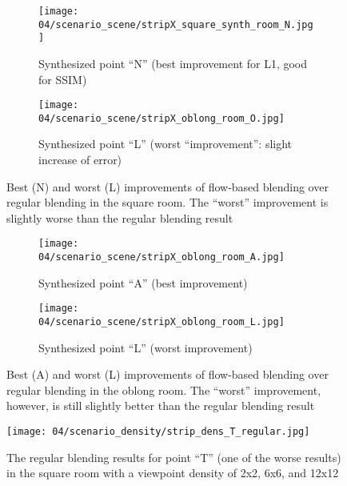 \begin{figure}
\centering
    \hfill
    \begin{subfigure}[b]{\textwidth}
            \centering
            \texttt{[image: 04/scenario\_scene/stripX\_square\_synth\_room\_N.jpg]}
            \caption{Synthesized point ``N'' (best improvement for L1, good for SSIM)}
    \end{subfigure}
    \hfill

    \hfill
    \begin{subfigure}[b]{\textwidth}
            \centering
            \texttt{[image: 04/scenario\_scene/stripX\_oblong\_room\_O.jpg]}
            \caption{Synthesized point ``L'' (worst ``improvement'': slight increase of error)}
    \end{subfigure}
    \hfill
  \caption[Best and worst improvements of flow-based blending over regular blending in the square room]{Best (N) and worst (L) improvements of flow-based blending over regular blending in the square room. The ``worst'' improvement is slightly worse than the regular blending result} \label{fig:scene_square_best_worst}
\end{figure}

\begin{figure}
\centering
    \hfill
    \begin{subfigure}[b]{\textwidth}
            \centering
            \texttt{[image: 04/scenario\_scene/stripX\_oblong\_room\_A.jpg]}
            \caption{Synthesized point ``A'' (best improvement)}
    \end{subfigure}
    \hfill

    \hfill
    \begin{subfigure}[b]{\textwidth}
            \centering
            \texttt{[image: 04/scenario\_scene/stripX\_oblong\_room\_L.jpg]}
            \caption{Synthesized point ``L'' (worst improvement)}
    \end{subfigure}
    \hfill
  \caption[Best and worst improvements of flow-based blending over regular blending in the oblong room]{Best (A) and worst (L) improvements of flow-based blending over regular blending in the oblong room. The ``worst'' improvement, however, is still slightly better than the regular blending result} \label{fig:scene_oblong_best_worst}
\end{figure}

\begin{figure}
		\centering
    \texttt{[image: 04/scenario\_density/strip\_dens\_T\_regular.jpg]}
		\caption{The regular blending results for point ``T'' (one of the worse results) in the square room with a viewpoint density of 2x2, 6x6, and 12x12}
		\label{fig:density_regular_T}
\end{figure}

